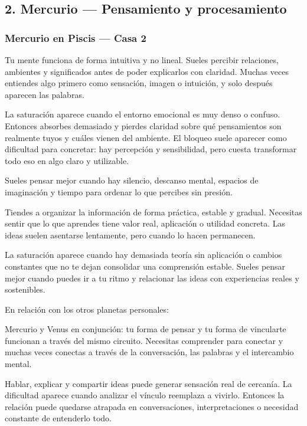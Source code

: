\documentclass[11pt,a4paper]{article}
\begin{document}
\vspace{0.8cm}

\subsection{2. Mercurio — Pensamiento y procesamiento}

\subsubsection*{Mercurio en Piscis — Casa 2}

\RaggedRight
Tu mente funciona de forma intuitiva y no lineal. Sueles percibir relaciones, ambientes y significados antes de poder explicarlos con claridad. Muchas veces entiendes algo primero como sensación, imagen o intuición, y solo después aparecen las palabras.

La saturación aparece cuando el entorno emocional es muy denso o confuso. Entonces absorbes demasiado y pierdes claridad sobre qué pensamientos son realmente tuyos y cuáles vienen del ambiente. El bloqueo suele aparecer como dificultad para concretar: hay percepción y sensibilidad, pero cuesta transformar todo eso en algo claro y utilizable.

Sueles pensar mejor cuando hay silencio, descanso mental, espacios de imaginación y tiempo para ordenar lo que percibes sin presión.

Tiendes a organizar la información de forma práctica, estable y gradual. Necesitas sentir que lo que aprendes tiene valor real, aplicación o utilidad concreta. Las ideas suelen asentarse lentamente, pero cuando lo hacen permanecen.

La saturación aparece cuando hay demasiada teoría sin aplicación o cambios constantes que no te dejan consolidar una comprensión estable. Sueles pensar mejor cuando puedes ir a tu ritmo y relacionar las ideas con experiencias reales y sostenibles.

En relación con los otros planetas personales:

Mercurio y Venus en conjunción: tu forma de pensar y tu forma de vincularte funcionan a través del mismo circuito. Necesitas comprender para conectar y muchas veces conectas a través de la conversación, las palabras y el intercambio mental.

Hablar, explicar y compartir ideas puede generar sensación real de cercanía. La dificultad aparece cuando analizar el vínculo reemplaza a vivirlo. Entonces la relación puede quedarse atrapada en conversaciones, interpretaciones o necesidad constante de entenderlo todo.
\end{document}

